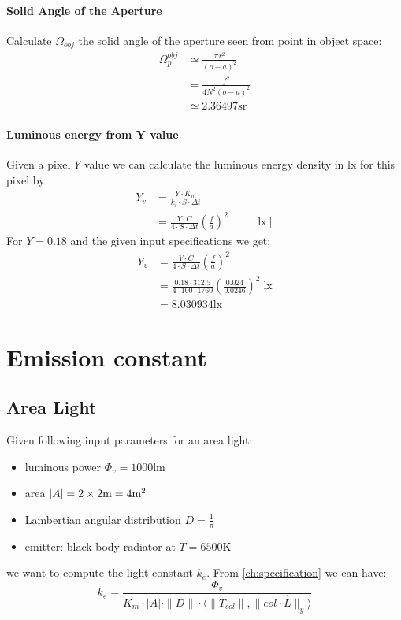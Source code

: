 \fi

\paragraph{Solid Angle of the Aperture}
Calculate $\Omega_{obj}$ the solid angle of the aperture seen from point in object space:
\begin{align*}
\Omega_p^{obj} &\simeq \frac{\pi r^2}{(o-a)^2}\\
&= \frac{f^2}{4N^2(o-a)^2}\\
&\simeq  \num{2.36497}\unit{\steradian}
\end{align*}

\paragraph{Luminous energy from Y value}

Given a pixel $Y$ value we can calculate the luminous energy density in \unit{\lux} for this pixel by
\begin{align*}
Y_v &= \frac{Y\cdot K_m}{ k_i\cdot S \cdot \Delta t} \\
&= \frac{Y\cdot C}{ 4\cdot S \cdot \Delta t} \left(\frac{f}{a}\right)^2
\qquad [\unit{\lux}]
\end{align*}
For $Y=0.18$ and the given input specifications we get:
\begin{align*}
Y_v &= \frac{Y\cdot C}{ 4\cdot S \cdot \Delta t} \left(\frac{f}{a}\right)^2 \\
&= \frac{0.18\cdot 312.5}{ 4\cdot 100 \cdot 1/60} \left(\frac{0.024}{0.0246}\right)^2 \;\unit{\lux} \\
&= \num{8.030934}\unit{\lux}
\end{align*}

\section{Emission constant}

\subsection{Area Light}
Given following input parameters for an area light:
\begin{itemize}
\item luminous power $\Phi_v=\num{1000}\unit{\lumen}$
\item area $|A|= \numproduct{2 x 2}\unit{\meter} = \num{4}\unit{\square\meter}$
\item Lambertian angular distribution $D = \frac1{\pi}$
\item emitter: black body radiator at $T=\num{6500}\unit{\kelvin}$
\end{itemize}
we want to compute the light constant $k_e$. From \cref{ch:specification} we can  have:
\begin{displaymath}
 k_e = \frac{\Phi_v}{K_m \cdot |A| \cdot \|D\| \cdot \langle \|T_{col}\|, \|col\cdot\hat{L}\|_{\bar y} \rangle }
\end{displaymath}

